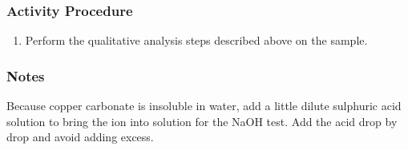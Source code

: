 \subsubsection{Activity Procedure}
\begin{enumerate}
\item{Perform the qualitative analysis steps described above on the sample.}
\end{enumerate}

\subsubsection{Notes}
Because copper carbonate is insoluble in water, add a little dilute sulphuric acid solution to bring the ion into solution for the NaOH test. Add the acid drop by drop and avoid adding excess.
